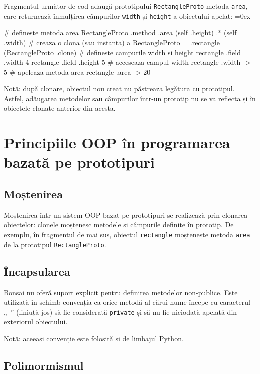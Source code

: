 \documentclass[12pt,a4paper]{memoir}
\renewcommand{\c}{\texttt}
\newenvironment{code}
{
\definecolor{shadecolor}{gray}{0.91}
\topsep=0ex
\relax
\shaded
\verbatim
}
{
\endverbatim
\endshaded
}
\begin{document}
Fragmentul următor de cod adaugă prototipului \c{RectangleProto} metoda \c{area}, care returnează înmulțirea câmpurilor \c{width} și \c{height} a obiectului apelat:
\begin{code}
# defineste metoda area 
RectangleProto .method .area { 
  (self .height) .* (self .width)
}
# creaza o clona (sau instanta) a RectangleProto
= .rectangle (RectangleProto .clone)
# defineste campurile width si height
rectangle .field .width 4
rectangle .field .height 5
# acceseaza campul width
rectangle .width
  -> 5
# apeleaza metoda area
rectangle .area
  -> 20
\end{code}

Notă: după clonare, obiectul nou creat nu păstreaza legătura cu prototipul. Astfel, adăugarea metodelor sau câmpurilor într-un prototip nu se va reflecta și în obiectele clonate anterior din acesta.

\section{Principiile OOP în programarea bazată pe prototipuri}

\subsection{Moștenirea}

Moștenirea într-un sistem OOP bazat pe prototipuri se realizează prin clonarea obiectelor: clonele moștenesc metodele și câmpurile definite în prototip. De exemplu, în fragmentul de mai sus, obiectul \c{rectangle} moștenește metoda \c{area} de la prototipul \c{RectangleProto}.

\subsection{Încapsularea}

Bonsai nu oferă suport explicit pentru definirea metodelor non-publice. Este utilizată în schimb convenția ca orice metodă al cărui nume începe cu caracterul „\c{\_}” (liniuță-jos) să fie considerată \c{private} și să nu fie niciodată apelată din exteriorul obiectului.

Notă: aceeași convenție este folosită și de limbajul Python\cite{python_classes}.

\subsection{Polimormismul}
\end{document}
